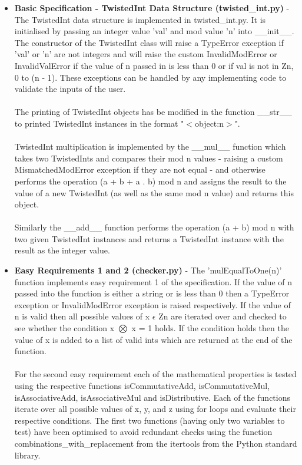 \documentclass[11]{article}
\begin{document}
		\begin{itemize}
			\item \textbf{Basic Specification - TwistedInt Data Structure (twisted\_int.py)} - The TwistedInt data structure is implemented in twisted\_int.py. It is initialised by passing an integer value 'val' and mod value 'n' into \_\_init\_\_. The constructor of the TwistedInt class will raise a TypeError exception if 'val' or 'n' are not integers and will raise the custom InvalidModError or InvalidValError if the value of n passed in is less than 0 or if val is not in Zn, 0 to (n - 1). These exceptions can be handled by any implementing code to validate the inputs of the user. \\\\ The printing of TwistedInt objects has be modified in the function \_\_str\_\_ to printed TwistedInt instances in the format "$<$object:n$>$". \\\\ TwistedInt multiplication is implemented by the \_\_mul\_\_ function which takes two TwistedInts and compares their mod n values - raising a custom MismatchedModError exception if they are not equal - and otherwise performs the operation (a + b + a . b) mod n and assigns the result to the value of a new TwistedInt (as well as the same mod n value) and returns this object. \\\\ Similarly the \_\_add\_\_ function performs the operation (a + b) mod n with two given TwistedInt instances and returns a TwistedInt instance with the result as the integer value. 
			
			\item \textbf{Easy Requirements 1 and 2 (checker.py)} - The 'mulEqualToOne(n)' function implements easy requirement 1 of the specification. If the value of n passed into the function is either a string or is less than 0 then a TypeError exception or InvalidModError exception is raised respectively. If the value of n is valid then all possible values of x $\epsilon$ Zn are iterated over and checked to see whether the condition x $\bigotimes$ x = 1 holds. If the condition holds then the value of x is added to a list of valid ints which are returned at the end of the function. \\\\ For the second easy requirement each of the mathematical properties is tested using the respective functions isCommutativeAdd, isCommutativeMul, isAssociativeAdd, isAssociativeMul and isDistributive. Each of the functions iterate over all possible values of x, y, and z using for loops and evaluate their respective conditions. The first two functions (having only two variables to test) have been optimised to avoid redundant checks using the function combinations\_with\_replacement from the itertools from the Python standard library.
			

\end{itemize}
\end{document}
